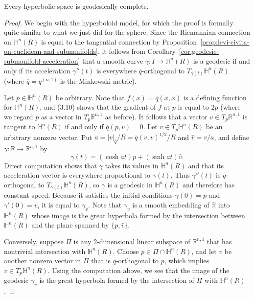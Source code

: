 \begin{theorem}
\label{thm:hyperbolic-geodesically-complete}

Every hyperbolic space is geodesically complete.

\begin{proof}
We begin with the hyperboloid model, for which the proof is formally quite similar to what we just did for the sphere. Since the Riemannian connection on $\mathbb{H}^n(R)$ is equal to the tangential connection by Proposition~\ref{prop:levi-civita-on-euclidean-and-submanifolds}, it follows from Corollary~\ref{cor:geodesic-submanifold-acceleration} that a smooth curve $\gamma: I \to \mathbb{H}^n(R)$ is a geodesic if and only if its acceleration $\gamma''(t)$ is everywhere $\overline{q}$-orthogonal to $T_{\gamma(t)}\mathbb{H}^n(R)$ (where $\overline{q} = q^{(n,1)}$ is the Minkowski metric).

Let $p \in \mathbb{H}^n(R)$ be arbitrary. Note that $f(x) = \overline{q}(x,x)$ is a defining function for $\mathbb{H}^n(R)$, and (3.10) shows that the gradient of $f$ at $p$ is equal to $2p$ (where we regard $p$ as a vector in $T_p \mathbb{R}^{n,1}$ as before). It follows that a vector $v \in T_p \mathbb{R}^{n,1}$ is tangent to $\mathbb{H}^n(R)$ if and only if $\overline{q}(p,v) = 0$. Let $v \in T_p \mathbb{H}^n(R)$ be an arbitrary nonzero vector. Put $a = |v|_{\overline{q}}/R = \overline{q}(v,v)^{1/2}/R$ and $\hat{v} = v/a$, and define $\gamma: \mathbb{R} \to \mathbb{R}^{n,1}$ by
\[
\gamma(t) = (\cosh at)p + (\sinh at)\hat{v}.
\]
Direct computation shows that $\gamma$ takes its values in $\mathbb{H}^n(R)$ and that its acceleration vector is everywhere proportional to $\gamma(t)$. Thus $\gamma''(t)$ is $\overline{q}$-orthogonal to $T_{\gamma(t)}\mathbb{H}^n(R)$, so $\gamma$ is a geodesic in $\mathbb{H}^n(R)$ and therefore has constant speed. Because it satisfies the initial conditions $\gamma(0) = p$ and $\gamma'(0) = v$, it is equal to $\gamma_v$. Note that $\gamma_v$ is a smooth embedding of $\mathbb{R}$ into $\mathbb{H}^n(R)$ whose image is the great hyperbola formed by the intersection between $\mathbb{H}^n(R)$ and the plane spanned by $\{p, \hat{v}\}$.

Conversely, suppose $\Pi$ is any 2-dimensional linear subspace of $\mathbb{R}^{n,1}$ that has nontrivial intersection with $\mathbb{H}^n(R)$. Choose $p \in \Pi \cap \mathbb{H}^n(R)$, and let $v$ be another nonzero vector in $\Pi$ that is $\overline{q}$-orthogonal to $p$, which implies $v \in T_p \mathbb{H}^n(R)$. Using the computation above, we see that the image of the geodesic $\gamma_v$ is the great hyperbola formed by the intersection of $\Pi$ with $\mathbb{H}^n(R)$.


\end{proof}
\end{theorem}
